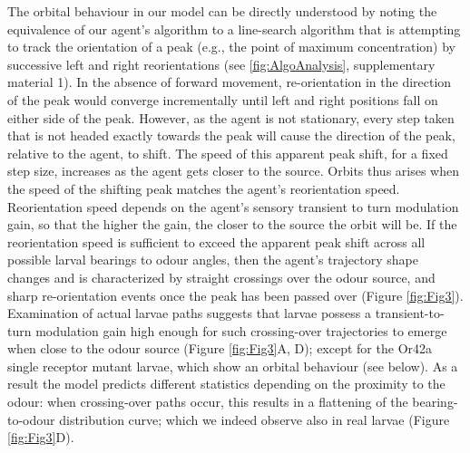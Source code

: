 \documentclass[10pt,a4paper]{article}
\begin{document}
The orbital behaviour in our model can be directly understood by noting the equivalence of our agent's algorithm to a line-search algorithm that is attempting to track the orientation of a peak (e.g., the point of maximum concentration) by successive left and right reorientations (see \ref{fig:AlgoAnalysis}, supplementary material 1). In the absence of forward movement, re-orientation in the direction of the peak would converge incrementally until left and right positions fall on either side of the peak. However, as the agent is not stationary, every step taken that is not headed exactly towards the peak will cause the direction of the peak, relative to the agent, to shift. The speed of this apparent peak shift, for a fixed step size, increases as the agent gets closer to the source. Orbits thus arises when the speed of the shifting peak matches the agent's reorientation speed. Reorientation speed depends on the agent's sensory transient to turn modulation gain, so that the higher the gain, the closer to the source the orbit will be. If the reorientation speed is sufficient to exceed the apparent peak shift across all possible larval bearings to odour angles, then the agent's trajectory shape changes and is characterized by straight crossings over the odour source, and sharp re-orientation events once the peak has been passed over (Figure \ref{fig:Fig3}). Examination of actual larvae paths suggests that larvae possess a transient-to-turn modulation gain high enough for such crossing-over trajectories to emerge when close to the odour source (Figure \ref{fig:Fig3}A, D); except for the Or42a single receptor mutant larvae, which show an orbital behaviour (see below). As a result the model predicts different statistics depending on the proximity to the odour: when crossing-over paths occur, this results in a flattening of the bearing-to-odour distribution curve; which we indeed observe also in real larvae (Figure \ref{fig:Fig3}D).
\end{document}
